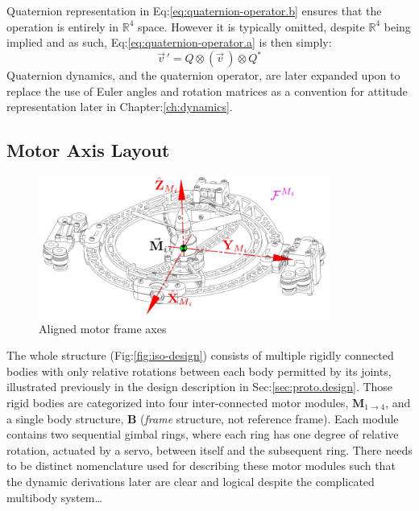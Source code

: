 Quaternion representation in Eq:\ref{eq:quaternion-operator.b} ensures that the operation is entirely in $\mathbb{R}^4$ space. However it is typically omitted, despite $\mathbb{R}^4$ being implied and as such, Eq:\ref{eq:quaternion-operator.a} is then simply:
\begin{equation}
\vec{v}^{\hspace{1pt}}\text{}'=Q \otimes (\vec{v}\hspace{2pt}) \otimes Q^*
\end{equation}
Quaternion dynamics, and the quaternion operator, are later expanded upon to replace the use of Euler angles and rotation matrices as a convention for attitude representation later in Chapter:\ref{ch:dynamics}.
\subsection{Motor Axis Layout}
\label{subsec:proto.conventions.motoraxis}
\begin{figure}[htbp]
\centering
\includegraphics[width=0.85\textwidth]{figs/motor-axes}
\caption{Aligned motor frame axes}
\label{fig:motor-axes}
\vspace{-10pt}
\end{figure}
The whole structure (Fig:\ref{fig:iso-design}) consists of multiple rigidly connected bodies with only relative rotations between each body permitted by its joints, illustrated previously in the design description in Sec:\ref{sec:proto.design}. Those rigid bodies are categorized into four inter-connected motor modules, $\mathbf{M}_{1\rightarrow 4}$, and a single body structure, $\mathbf{B}$ (\emph{frame} structure, not reference frame). Each module contains two sequential gimbal rings, where each ring has one degree of relative rotation, actuated by a servo, between itself and the subsequent ring. There needs to be distinct nomenclature used for describing these motor modules such that the dynamic derivations later are clear and logical despite the complicated multibody system\ldots
